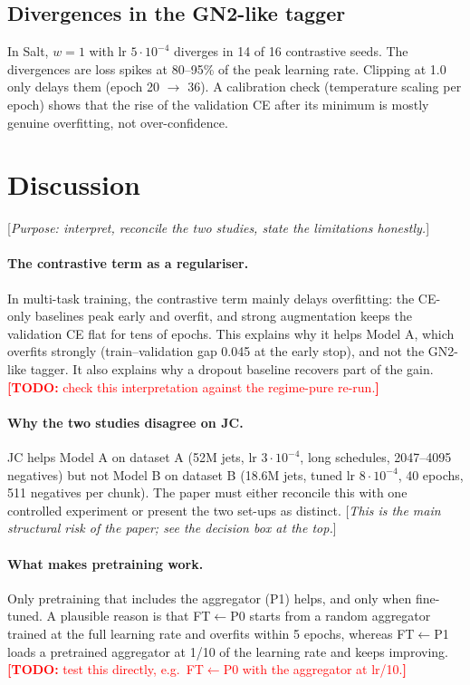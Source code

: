 \documentclass[11pt,a4paper]{article}
\newcommand{\todo}[1]{\textcolor{red}{\textbf{[TODO:} #1\textbf{]}}}
\newcommand{\note}[1]{\textcolor{blue!70!black}{[\emph{#1}]}}
\newcommand{\from}[2]{#1$\leftarrow$#2}
\begin{document}
\subsection{Divergences in the GN2-like tagger}
In Salt, $w=1$ with lr $5\cdot10^{-4}$ diverges in 14 of 16 contrastive seeds. The
divergences are loss spikes at 80--95\% of the peak learning rate. Clipping at 1.0 only
delays them (epoch 20 $\to$ 36). A calibration check (temperature scaling per epoch) shows
that the rise of the validation CE after its minimum is mostly genuine overfitting, not
over-confidence.

\section{Discussion}
\label{sec:discussion}

\note{Purpose: interpret, reconcile the two studies, state the limitations honestly.}

\paragraph{The contrastive term as a regulariser.}
In multi-task training, the contrastive term mainly delays overfitting: the CE-only
baselines peak early and overfit, and strong augmentation keeps the validation CE flat for
tens of epochs. This explains why it helps Model A, which overfits strongly (train--validation
gap 0.045 at the early stop), and not the GN2-like tagger. It also explains why a dropout
baseline recovers part of the gain.
\todo{check this interpretation against the regime-pure re-run.}

\paragraph{Why the two studies disagree on JC.}
JC helps Model A on dataset A (52M jets, lr $3\cdot10^{-4}$, long schedules, 2047--4095
negatives) but not Model B on dataset B (18.6M jets, tuned lr $8\cdot10^{-4}$, 40 epochs,
511 negatives per chunk). The paper must either reconcile this with one controlled
experiment or present the two set-ups as distinct. \note{This is the main structural risk
of the paper; see the decision box at the top.}

\paragraph{What makes pretraining work.}
Only pretraining that includes the aggregator (P1) helps, and only when fine-tuned. A
plausible reason is that \from{FT}{P0} starts from a random aggregator trained at the full
learning rate and overfits within 5 epochs, whereas \from{FT}{P1} loads a pretrained
aggregator at 1/10 of the learning rate and keeps improving. \todo{test this directly,
e.g.\ \from{FT}{P0} with the aggregator at lr/10.}
\end{document}
